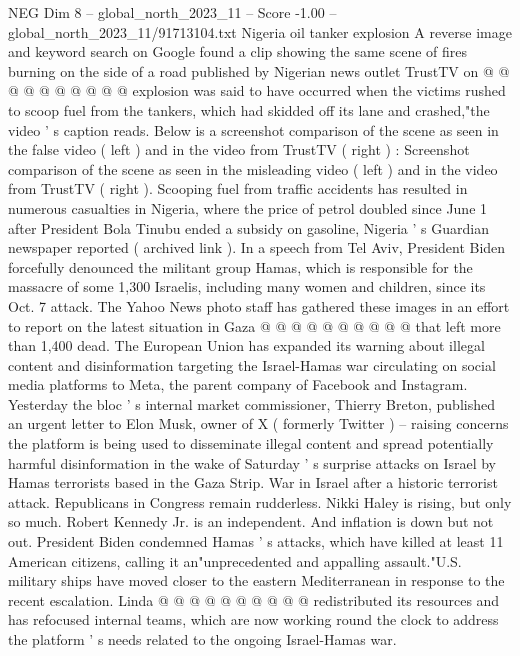 \begin{textsample}{NEG Dim 8 – global\_north\_2023\_11 – Score -1.00 – global\_north\_2023\_11/91713104.txt}
Nigeria oil tanker explosion A reverse image and keyword search on Google found a clip showing the same scene of fires burning on the side of a road published by Nigerian news outlet TrustTV on @ @ @ @ @ @ @ @ @ @ explosion was said to have occurred when the victims rushed to scoop fuel from the tankers, which had skidded off its lane and crashed,"the video ' s caption reads.
Below is a screenshot comparison of the scene as seen in the false video ( left ) and in the video from TrustTV ( right ) : Screenshot comparison of the scene as seen in the misleading video ( left ) and in the video from TrustTV ( right ).
Scooping fuel from traffic accidents has resulted in numerous casualties in Nigeria, where the price of petrol doubled since June 1 after President Bola Tinubu ended a subsidy on gasoline, Nigeria ' s Guardian newspaper reported ( archived link ).
In a speech from Tel Aviv, President Biden forcefully denounced the militant group Hamas, which is responsible for the massacre of some 1,300 Israelis, including many women and children, since its Oct. 7 attack.
The Yahoo News photo staff has gathered these images in an effort to report on the latest situation in Gaza @ @ @ @ @ @ @ @ @ @ that left more than 1,400 dead.
The European Union has expanded its warning about illegal content and disinformation targeting the Israel-Hamas war circulating on social media platforms to Meta, the parent company of Facebook and Instagram.
Yesterday the bloc ' s internal market commissioner, Thierry Breton, published an urgent letter to Elon Musk, owner of X ( formerly Twitter ) -- raising concerns the platform is being used to disseminate illegal content and spread potentially harmful disinformation in the wake of Saturday ' s surprise attacks on Israel by Hamas terrorists based in the Gaza Strip.
War in Israel after a historic terrorist attack.
Republicans in Congress remain rudderless.
Nikki Haley is rising, but only so much.
Robert Kennedy Jr. is an independent.
And inflation is down but not out.
President Biden condemned Hamas ' s attacks, which have killed at least 11 American citizens, calling it an"unprecedented and appalling assault."U.S. military ships have moved closer to the eastern Mediterranean in response to the recent escalation.
Linda @ @ @ @ @ @ @ @ @ @ redistributed its resources and has refocused internal teams, which are now working round the clock to address the platform ' s needs related to the ongoing Israel-Hamas war.

\end{textsample}
